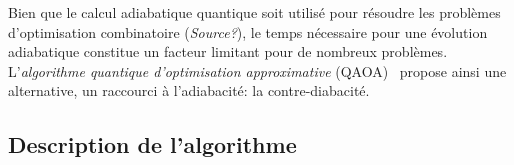 Bien que le calcul adiabatique quantique soit utilisé pour résoudre les problèmes d'optimisation combinatoire (\textcolor{mydarkred}{\textit{Source?}}), le temps nécessaire pour une évolution adiabatique constitue un facteur limitant pour de nombreux problèmes. L'\textit{algorithme quantique d'optimisation approximative} (QAOA)~\cite{farhiQuantumApproximateOptimization2014} propose ainsi une alternative, un raccourci à l'adiabacité: la contre-diabacité.


\subsection{Description de l'algorithme}
\label{subsec:description-algorithme}

